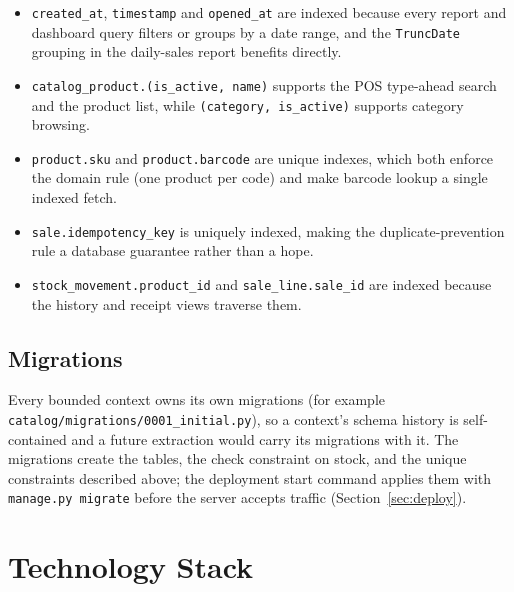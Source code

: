 \documentclass[11pt,a4paper]{article}
\begin{document}
\begin{itemize}[leftmargin=1.4em]
  \item \texttt{created\_at}, \texttt{timestamp} and \texttt{opened\_at} are indexed because every
  report and dashboard query filters or groups by a date range, and the \texttt{TruncDate} grouping in
  the daily-sales report benefits directly.
  \item \texttt{catalog\_product.(is\_active, name)} supports the POS type-ahead search and the
  product list, while \texttt{(category, is\_active)} supports category browsing.
  \item \texttt{product.sku} and \texttt{product.barcode} are unique indexes, which both enforce the
  domain rule (one product per code) and make barcode lookup a single indexed fetch.
  \item \texttt{sale.idempotency\_key} is uniquely indexed, making the duplicate-prevention rule a
  database guarantee rather than a hope.
  \item \texttt{stock\_movement.product\_id} and \texttt{sale\_line.sale\_id} are indexed because the
  history and receipt views traverse them.
\end{itemize}

\subsection{Migrations}

Every bounded context owns its own migrations (for example \texttt{catalog/migrations/0001\_initial.py}),
so a context's schema history is self-contained and a future extraction would carry its migrations
with it. The migrations create the tables, the check constraint on stock, and the unique constraints
described above; the deployment start command applies them with \texttt{manage.py migrate} before the
server accepts traffic (Section~\ref{sec:deploy}).

\section{Technology Stack}
\label{sec:stack}
\end{document}
